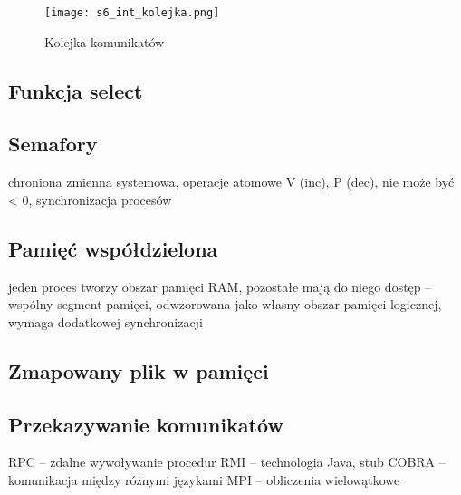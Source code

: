 \begin{figure}[!h]
\centering
\texttt{[image: s6\_int\_kolejka.png]}
\caption{Kolejka komunikatów}
\end{figure}

\subsection{Funkcja select}

\subsection{Semafory}

chroniona zmienna systemowa, operacje atomowe V (inc), P (dec), nie może być < 0, synchronizacja procesów

\subsection{Pamięć współdzielona}

jeden proces tworzy obszar pamięci RAM, pozostałe mają do niego dostęp -- wspólny segment pamięci, odwzorowana jako własny obszar pamięci logicznej, wymaga dodatkowej synchronizacji

\subsection{Zmapowany plik w pamięci}

\subsection{Przekazywanie komunikatów}

RPC -- zdalne wywoływanie procedur
RMI -- technologia Java, stub
COBRA -- komunikacja między różnymi językami
MPI -- obliczenia wielowątkowe